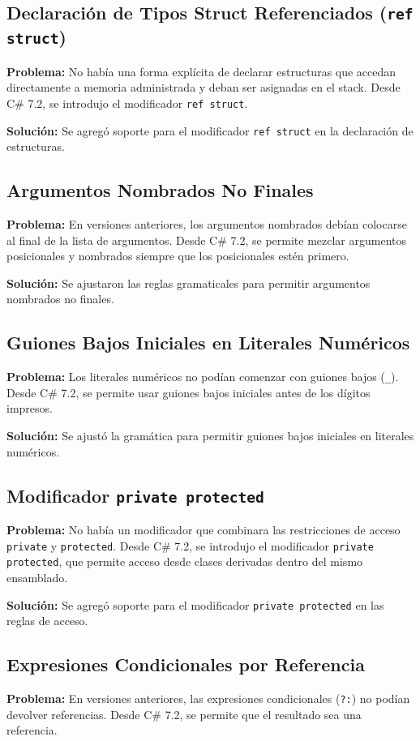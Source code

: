 \subsection*{Declaración de Tipos Struct Referenciados (\texttt{ref struct})}
\textbf{Problema:} No había una forma explícita de declarar estructuras que accedan directamente a memoria administrada y deban ser asignadas en el stack. Desde C\# 7.2, se introdujo el modificador \texttt{ref struct}.

\textbf{Solución:} Se agregó soporte para el modificador \texttt{ref struct} en la declaración de estructuras.

\subsection*{Argumentos Nombrados No Finales}
\textbf{Problema:} En versiones anteriores, los argumentos nombrados debían colocarse al final de la lista de argumentos. Desde C\# 7.2, se permite mezclar argumentos posicionales y nombrados siempre que los posicionales estén primero.

\textbf{Solución:} Se ajustaron las reglas gramaticales para permitir argumentos nombrados no finales.

\subsection*{Guiones Bajos Iniciales en Literales Numéricos}
\textbf{Problema:} Los literales numéricos no podían comenzar con guiones bajos (\texttt{\_}). Desde C\# 7.2, se permite usar guiones bajos iniciales antes de los dígitos impresos.

\textbf{Solución:} Se ajustó la gramática para permitir guiones bajos iniciales en literales numéricos.

\subsection*{Modificador \texttt{private protected}}
\textbf{Problema:} No había un modificador que combinara las restricciones de acceso \texttt{private} y \texttt{protected}. Desde C\# 7.2, se introdujo el modificador \texttt{private protected}, que permite acceso desde clases derivadas dentro del mismo ensamblado.

\textbf{Solución:} Se agregó soporte para el modificador \texttt{private protected} en las reglas de acceso.

\subsection*{Expresiones Condicionales por Referencia}
\textbf{Problema:} En versiones anteriores, las expresiones condicionales (\texttt{?:}) no podían devolver referencias. Desde C\# 7.2, se permite que el resultado sea una referencia.

